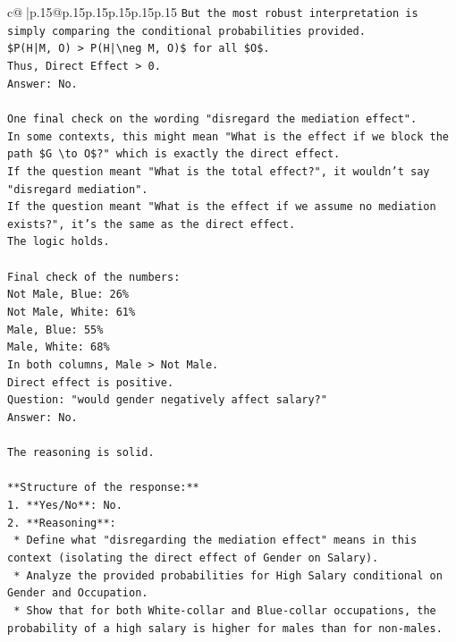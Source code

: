\documentclass{article}
\begin{document}
{\begin{supertabular}{c@{$\;$}|p{.15\linewidth}@{}p{.15\linewidth}p{.15\linewidth}p{.15\linewidth}p{.15\linewidth}p{.15\linewidth}}
{{{\texttt{But the most robust interpretation is simply comparing the conditional probabilities provided.} \\
\texttt{\$P(H|M, O) > P(H|\textbackslash{}neg M, O)\$ for all \$O\$.} \\
\texttt{Thus, Direct Effect > 0.} \\
\texttt{Answer: No.} \\
\\ 
\texttt{One final check on the wording "disregard the mediation effect".} \\
\texttt{In some contexts, this might mean "What is the effect if we block the path \$G \textbackslash{}to O\$?" which is exactly the direct effect.} \\
\texttt{If the question meant "What is the total effect?", it wouldn't say "disregard mediation".} \\
\texttt{If the question meant "What is the effect if we assume no mediation exists?", it's the same as the direct effect.} \\
\texttt{The logic holds.} \\
\\ 
\texttt{Final check of the numbers:} \\
\texttt{Not Male, Blue: 26\%} \\
\texttt{Not Male, White: 61\%} \\
\texttt{Male, Blue: 55\%} \\
\texttt{Male, White: 68\%} \\
\texttt{In both columns, Male > Not Male.} \\
\texttt{Direct effect is positive.} \\
\texttt{Question: "would gender negatively affect salary?"} \\
\texttt{Answer: No.} \\
\\ 
\texttt{The reasoning is solid.} \\
\\ 
\texttt{**Structure of the response:**} \\
\texttt{1.  **Yes/No**: No.} \\
\texttt{2.  **Reasoning**:} \\
\texttt{    *   Define what "disregarding the mediation effect" means in this context (isolating the direct effect of Gender on Salary).} \\
\texttt{    *   Analyze the provided probabilities for High Salary conditional on Gender and Occupation.} \\
\texttt{    *   Show that for both White{-}collar and Blue{-}collar occupations, the probability of a high salary is higher for males than for non{-}males.} \\
}}}
\end{supertabular}}
\end{document}
